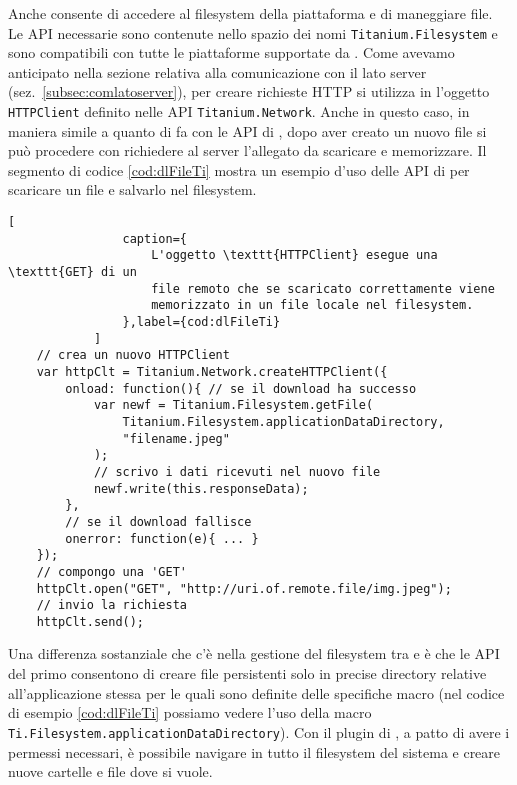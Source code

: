 			Anche \tisdk{} consente di accedere al filesystem della piattaforma 
			e di maneggiare file. Le API necessarie sono contenute nello 
			spazio dei nomi \texttt{Titanium.Filesystem} e sono compatibili 
			con tutte le piattaforme supportate da \tisdk{}. Come avevamo 
			anticipato nella sezione relativa alla comunicazione con il lato 
			server (sez.~\ref{subsec:comlatoserver}), per creare richieste HTTP 
			si utilizza in \tisdk{} l'oggetto \texttt{HTTPClient} definito nelle 
			API \texttt{Titanium.Network}. Anche in questo caso, in maniera 
			simile a quanto di fa con le API di \pg{}, dopo aver creato un nuovo 
			file si può procedere con richiedere al server l'allegato da 
			scaricare e memorizzare. Il segmento di codice \ref{cod:dlFileTi} 
			mostra un esempio d'uso delle API di \tisdk{} per scaricare un file 
			e salvarlo nel filesystem.
			\begin{lstlisting}[
				caption={
					L'oggetto \texttt{HTTPClient} esegue una \texttt{GET} di un 
					file remoto che se scaricato correttamente viene 
					memorizzato in un file locale nel filesystem.
				},label={cod:dlFileTi}
			]
	// crea un nuovo HTTPClient
	var httpClt = Titanium.Network.createHTTPClient({
		onload: function(){ // se il download ha successo
			var newf = Titanium.Filesystem.getFile(
				Titanium.Filesystem.applicationDataDirectory,
				"filename.jpeg"
			);
			// scrivo i dati ricevuti nel nuovo file
			newf.write(this.responseData);
		},
		// se il download fallisce
		onerror: function(e){ ... }
	});
	// compongo una 'GET'
	httpClt.open("GET", "http://uri.of.remote.file/img.jpeg");
	// invio la richiesta
	httpClt.send();
			\end{lstlisting}
			Una differenza sostanziale che c'è nella gestione del filesystem 
			tra \tisdk{} e \pg{} è che le API del primo consentono di creare 
			file persistenti solo in precise directory relative 
			all'applicazione stessa per le quali sono definite delle specifiche 
			macro (nel codice di esempio \ref{cod:dlFileTi} possiamo vedere
			l'uso della macro \texttt{Ti.Filesystem.applicationDataDirectory}). 
			Con il plugin di \pg{}, a patto di avere i permessi necessari, è 
			possibile navigare in tutto il filesystem del sistema e creare nuove 
			cartelle e file dove si vuole.
		

